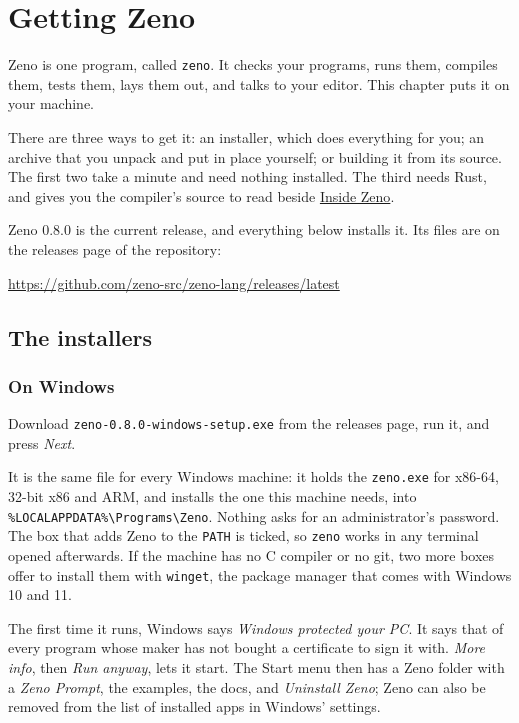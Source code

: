 \chapter{Getting Zeno}\label{ch-getting-zeno}

Zeno is one program, called \verb|zeno|. It checks your programs, runs
them, compiles them, tests them, lays them out, and talks to your
editor. This chapter puts it on your machine.

There are three ways to get it: an installer, which does everything
for you; an archive that you unpack and put in place yourself; or
building it from its source. The first two take a minute and need
nothing installed. The third needs Rust, and gives you the compiler's
source to read beside \hyperref[ch-inside]{Inside Zeno}.

Zeno 0.8.0 is the current release, and everything below installs it.
Its files are on the releases page of the repository:

\begin{center}
\url{https://github.com/zeno-src/zeno-lang/releases/latest}
\end{center}

\section{The installers}

\subsection{On Windows}

Download \verb|zeno-0.8.0-windows-setup.exe| from the releases page,
run it, and press \emph{Next}.

It is the same file for every Windows machine: it holds the
\verb|zeno.exe| for x86-64, 32-bit x86 and ARM, and installs the one
this machine needs, into \verb|%LOCALAPPDATA%\Programs\Zeno|. Nothing
asks for an administrator's password. The box that adds Zeno to the
\verb|PATH| is ticked, so \verb|zeno| works in any terminal opened
afterwards. If the machine has no C compiler or no git, two more boxes
offer to install them with \verb|winget|, the package manager that
comes with Windows 10 and 11.

The first time it runs, Windows says \emph{Windows protected your PC}.
It says that of every program whose maker has not bought a certificate
to sign it with. \emph{More info}, then \emph{Run anyway}, lets it
start. The Start menu then has a Zeno folder with a \emph{Zeno
Prompt}, the examples, the docs, and \emph{Uninstall Zeno}; Zeno can
also be removed from the list of installed apps in Windows' settings.

